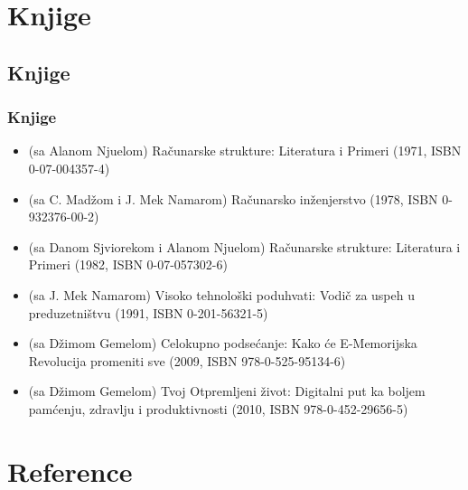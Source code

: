 \documentclass{beamer}
\begin{document}
\section{Knjige}
\subsection{Knjige}
\begin{frame}[fragile]\frametitle{Knjige}
	\begin{itemize}	
		\item  (sa Alanom Njuelom) Računarske strukture: Literatura i Primeri (1971, ISBN 0-07-004357-4)
		\item (sa C. Madžom i J. Mek Namarom) Računarsko inženjerstvo (1978, ISBN 0-932376-00-2)
		\item (sa Danom Sjviorekom i Alanom Njuelom) Računarske strukture: Literatura i Primeri (1982, ISBN 0-07-057302-6)
		\item (sa J. Mek Namarom) Visoko tehnološki poduhvati: Vodič za uspeh u preduzetništvu (1991, ISBN 0-201-56321-5)
		\item (sa Džimom Gemelom) Celokupno podsećanje: Kako će E-Memorijska Revolucija promeniti sve (2009, ISBN 978-0-525-95134-6)
		\item (sa Džimom Gemelom) Tvoj Otpremljeni život: Digitalni put ka boljem pamćenju, zdravlju i produktivnosti (2010, ISBN 978-0-452-29656-5)
	\end{itemize}
\end{frame}
\section{Reference}
\end{document}
